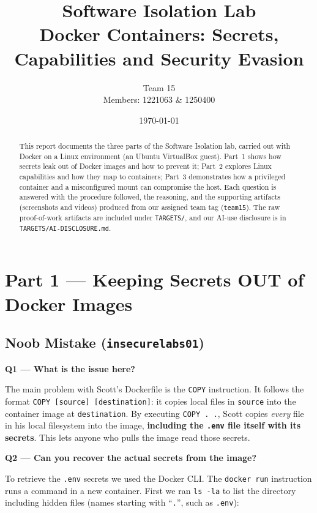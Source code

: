 \documentclass[11pt,a4paper]{article}
\title{\textbf{Software Isolation Lab}\\[0.3em]\large Docker Containers: Secrets, Capabilities and Security Evasion}
\author{Team 15 \\ Members: 1221063 \& 1250400}
\date{\today}
\newcommand{\question}[1]{\par\medskip\noindent\textbf{#1}\par\smallskip}
\begin{document}
\maketitle

\begin{abstract}
\noindent This report documents the three parts of the Software Isolation lab, carried out with Docker on a Linux environment (an Ubuntu VirtualBox guest). Part~1 shows how secrets leak out of Docker images and how to prevent it; Part~2 explores Linux capabilities and how they map to containers; Part~3 demonstrates how a privileged container and a misconfigured mount can compromise the host. Each question is answered with the procedure followed, the reasoning, and the supporting artifacts (screenshots and videos) produced from our assigned team tag (\texttt{team15}). The raw proof-of-work artifacts are included under \texttt{TARGETS/}, and our AI-use disclosure is in \texttt{TARGETS/AI-DISCLOSURE.md}.
\end{abstract}

\tableofcontents
\bigskip

\section{Part 1 --- Keeping Secrets OUT of Docker Images}

\subsection{Noob Mistake (\texttt{insecurelabs01})}

\question{Q1 --- What is the issue here?}
The main problem with Scott's Dockerfile is the \texttt{COPY} instruction. It follows the format \texttt{COPY [source] [destination]}: it copies local files in \texttt{source} into the container image at \texttt{destination}. By executing \texttt{COPY . .}, Scott copies \emph{every} file in his local filesystem into the image, \textbf{including the \texttt{.env} file itself with its secrets}. This lets anyone who pulls the image read those secrets.

\question{Q2 --- Can you recover the actual secrets from the image?}
To retrieve the \texttt{.env} secrets we used the Docker CLI. The \texttt{docker run} instruction runs a command in a new container. First we ran \texttt{ls -la} to list the directory including hidden files (names starting with ``\texttt{.}'', such as \texttt{.env}):
\end{document}
